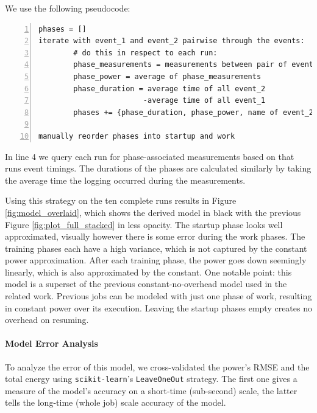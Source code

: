 We use the following pseudocode: 

\begin{minipage}{\linewidth}
    \begin{lstlisting}[frame=single, numbers=left, caption={Pseudocode for turning RoBERTa's power measurements into \modelname}, basicstyle=\ttfamily, label={listing:fitting_swap}]
phases = []
iterate with event_1 and event_2 pairwise through the events:
        # do this in respect to each run:
        phase_measurements = measurements between pair of events
        phase_power = average of phase_measurements
        phase_duration = average time of all event_2
                        -average time of all event_1
        phases += {phase_duration, phase_power, name of event_2}
        
manually reorder phases into startup and work
    \end{lstlisting}
\end{minipage}

In line 4 we query each run for phase-associated measurements based on that runs event timings. 
The durations of the phases are calculated similarly by taking the average time the logging occurred during the measurements.

Using this strategy on the ten complete runs results in Figure \ref{fig:model_overlaid}, which shows the derived model in black with the previous Figure \ref{fig:plot_full_stacked} in less opacity. 
The startup phase looks well approximated, visually however there is some error during the work phases.
The training phases each have a high variance, which is not captured by the constant power approximation. After each training  phase, the power goes down seemingly linearly, which is also approximated by the constant.
One notable point: this model is a superset of the previous constant-no-overhead model used in the related work.
Previous jobs can be modeled with just one phase of work, resulting in constant power over its execution. Leaving the startup phases empty creates no overhead on resuming.

\paragraph{Model Error Analysis}

To analyze the error of this model, we cross-validated the power's RMSE and the total energy using \verb|scikit-learn|'s \verb|LeaveOneOut| strategy. 
The first one gives a measure of the model's accuracy on a short-time (sub-second) scale, the latter tells the long-time (whole job) scale accuracy of the model.

